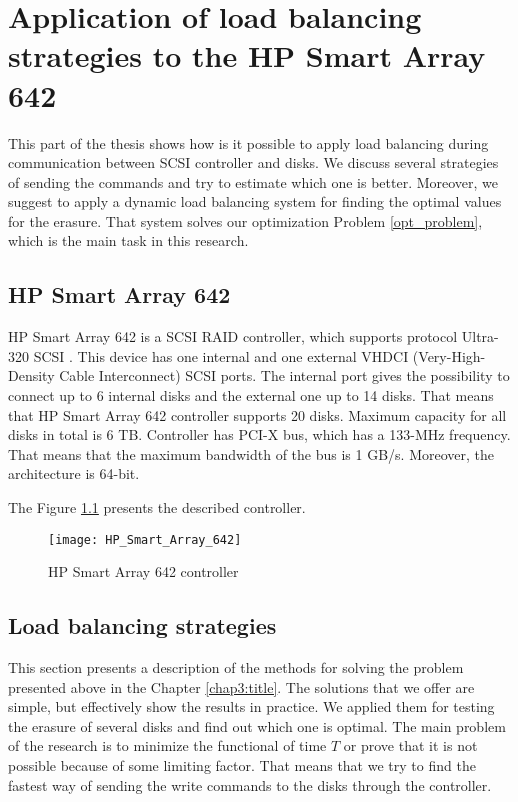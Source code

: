 \chapter{Application of load balancing strategies to the HP Smart Array 642}
\label{chap4:title}

This part of the thesis shows how is it possible to apply load balancing during communication between SCSI controller and disks. We discuss several strategies of sending the commands and try to estimate which one is better. Moreover, we suggest to apply a dynamic load balancing system for finding the optimal values for the erasure. That system solves our optimization Problem \ref{opt_problem}, which is the main task in this research.

\section{HP Smart Array 642}
HP Smart Array 642 is a SCSI RAID controller, which supports protocol Ultra-320 SCSI \cite{hp_642_desc}. This device has one internal and one external VHDCI (Very-High-Density Cable Interconnect) SCSI ports. The internal port gives the possibility to connect up to 6 internal disks and the external one up to 14 disks. That means that HP Smart Array 642 controller supports 20 disks. Maximum capacity for all disks in total is 6 TB. Controller has PCI-X bus, which has a 133-MHz frequency. That means that the maximum bandwidth of the bus is 1 GB/s. Moreover, the architecture is 64-bit.

The Figure \ref{fig:HP_Smart_Array_642} presents the described controller.
\begin{figure}[h]
\begin{center}
  \texttt{[image: HP\_Smart\_Array\_642]}
\end{center}
  \caption{HP Smart Array 642 controller}
  \label{fig:HP_Smart_Array_642}
\end{figure}


\section{Load balancing strategies}
\label{subsec:lb_strategies}

This section presents a description of the methods for solving the problem presented above in the Chapter \ref{chap3:title}. The solutions that we offer are simple, but effectively show the results in practice. We applied them for testing the erasure of several disks and find out which one is optimal. The main problem of the research is to minimize the functional of time $T$ or prove that it is not possible because of some limiting factor. That means that we try to find the fastest way of sending the write commands to the disks through the controller.


